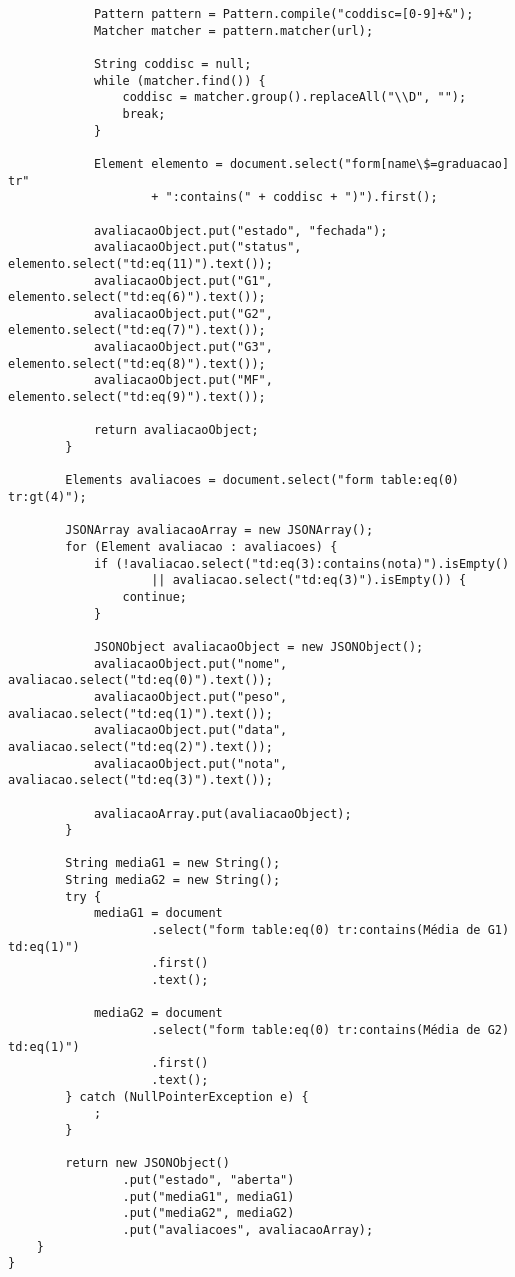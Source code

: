 \begin{lstlisting}
            Pattern pattern = Pattern.compile("coddisc=[0-9]+&");
            Matcher matcher = pattern.matcher(url);

            String coddisc = null;
            while (matcher.find()) {
                coddisc = matcher.group().replaceAll("\\D", "");
                break;
            }

            Element elemento = document.select("form[name\$=graduacao] tr"
                    + ":contains(" + coddisc + ")").first();

            avaliacaoObject.put("estado", "fechada");
            avaliacaoObject.put("status", elemento.select("td:eq(11)").text());
            avaliacaoObject.put("G1", elemento.select("td:eq(6)").text());
            avaliacaoObject.put("G2", elemento.select("td:eq(7)").text());
            avaliacaoObject.put("G3", elemento.select("td:eq(8)").text());
            avaliacaoObject.put("MF", elemento.select("td:eq(9)").text());

            return avaliacaoObject;
        }

        Elements avaliacoes = document.select("form table:eq(0) tr:gt(4)");

        JSONArray avaliacaoArray = new JSONArray();
        for (Element avaliacao : avaliacoes) {
            if (!avaliacao.select("td:eq(3):contains(nota)").isEmpty()
                    || avaliacao.select("td:eq(3)").isEmpty()) {
                continue;
            }

            JSONObject avaliacaoObject = new JSONObject();
            avaliacaoObject.put("nome", avaliacao.select("td:eq(0)").text());
            avaliacaoObject.put("peso", avaliacao.select("td:eq(1)").text());
            avaliacaoObject.put("data", avaliacao.select("td:eq(2)").text());
            avaliacaoObject.put("nota", avaliacao.select("td:eq(3)").text());

            avaliacaoArray.put(avaliacaoObject);
        }

        String mediaG1 = new String();
        String mediaG2 = new String();
        try {
            mediaG1 = document
                    .select("form table:eq(0) tr:contains(Média de G1) td:eq(1)")
                    .first()
                    .text();

            mediaG2 = document
                    .select("form table:eq(0) tr:contains(Média de G2) td:eq(1)")
                    .first()
                    .text();
        } catch (NullPointerException e) {
            ;
        }

        return new JSONObject()
                .put("estado", "aberta")
                .put("mediaG1", mediaG1)
                .put("mediaG2", mediaG2)
                .put("avaliacoes", avaliacaoArray);
    }
}
\end{lstlisting}

